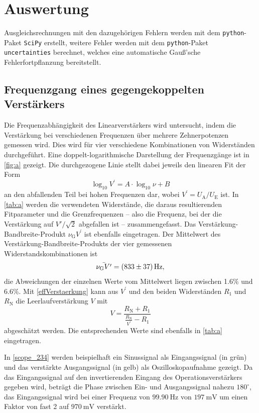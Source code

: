 \section{Auswertung}
\label{sec:evaluation}
Ausgleichsrechnungen mit den dazugehörigen Fehlern werden mit dem \texttt{python}-Paket \texttt{SciPy} \cite{scipy} erstellt, weitere Fehler werden mit dem \texttt{python}-Paket \texttt{uncertainties} \cite{uncertain} berechnet, welches eine automatische Gauß'sche Fehlerfortpflanzung bereitstellt.

\subsection{Frequenzgang eines gegengekoppelten Verst\"{a}rkers}
\label{Frequenzgang}
Die Frequenzabhängigkeit des Linearverstärkers wird untersucht, indem die Verstärkung bei verschiedenen Frequenzen über mehrere Zehnerpotenzen gemessen wird. Dies wird für vier verschiedene Kombinationen von Widerständen durchgeführt. Eine doppelt-logarithmische Darstellung der Frequenzgänge ist in \autoref{fig:a} gezeigt. Die durchgezogene Linie stellt dabei jeweils den linearen Fit der Form
\begin{equation}
	\log_{10} V^\prime = A \cdot \log_{10} \nu + B
	\label{linear_fit}
\end{equation}
an den abfallenden Teil bei hohen Frequenzen dar, wobei $V^\prime = U_\text{A} / U_\text{E}$ ist. In \autoref{tab:a} werden die verwendeten Widerstände, die daraus resultierenden Fitparameter und die Grenzfrequenzen -- also die Frequenz, bei der die Verstärkung auf $V'/\sqrt{2}$ abgefallen ist -- zusammengefasst. Das Verstärkung-Bandbreite-Produkt $\nu_\text{G}V^\prime$ ist ebenfalls eingetragen. Der Mittelwert des Verstärkung-Bandbreite-Produkts der vier gemessenen Widerstandskombinationen ist
\begin{equation*}
	\bar{\nu_\text{G}V^\prime} = \SI{833 \pm 37}{\hertz},
\end{equation*}
die Abweichungen der einzelnen Werte vom Mittelwert liegen zwischen 1.6\% und 6.6\%. Mit \autoref{effVerstaerkung} kann aus $V^\prime$ und den beiden Widerständen $R_1$ und $R_\text{N}$ die Leerlaufverstärkung $V$ mit
\begin{equation}
	V = \frac{R_\text{N} + R_1}{\frac{R_\text{N}}{V^\prime} - R_1}
\end{equation}
abgeschätzt werden. Die entsprechenden Werte sind ebenfalls in \autoref{tab:a} eingetragen.\par
In \autoref{scope_234} werden beispielhaft ein Sinussignal als Eingangssignal (in grün) und das verstärkte Ausgangssignal (in gelb) als Oszilloskopaufnahme gezeigt. Da das Eingangssignal auf den invertierenden Eingang des Operationsverstärkers gegeben wird, beträgt die Phase zwischen Ein- und Ausgangssignal nahezu $180^\circ$, das Eingangssignal wird bei einer Frequenz von $\SI{99.90}{\hertz}$ von $\SI{197}{\milli\volt}$ um einen Faktor von fast 2 auf $\SI{970}{\milli\volt}$ verstärkt.
